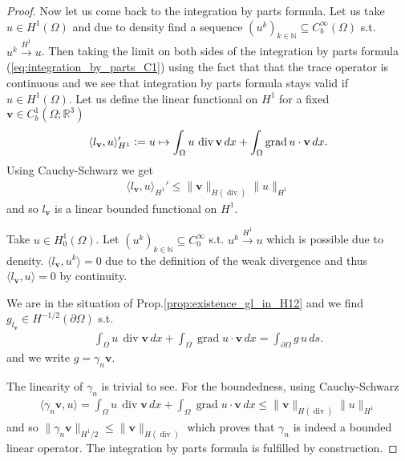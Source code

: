 \documentclass[12pt,a4paper]{article}
\numberwithin{equation}{subsection}
\numberwithin{lemma}{subsection}
\theoremstyle{definition}
\DeclareMathOperator{\diver}{div}
\DeclareMathOperator{\grad}{grad}
\newcommand{\naturalnum}{\mathbb{N}}
\newcommand{\real}{\mathbb{R}}
\begin{document}
\begin{proof}
    Now let us come back to the integration by parts formula. Let us take 
    $u \in H^1(\Omega)$ and due to density find a sequence $(u^k)_{k \in \naturalnum} \subseteq C_b^\infty(\Omega)$ 
    s.t. $u^k \xrightarrow{H^1} u$.
    Then taking the limit on both sides of the integration by parts formula 
    (\ref{eq:integration_by_parts_C1}) using the fact that 
    that the trace operator is continuous and we see that 
    integration by parts formula stays valid if $u \in H^1(\Omega)$. Let us define 
    the linear functional on $H^1$ for a fixed $\mathbf{v} \in C_b^1(\Omega;\real^3)$
    \begin{align*}
        \langle l_\mathbf{v}, u \rangle _{H^1}' \vcentcolon= u \mapsto \int_\Omega u \, \diver \mathbf{v} \, dx 
         + \int_\Omega \grad u \cdot \mathbf{v} \, dx.
    \end{align*}
    Using Cauchy-Schwarz we get
    \begin{align*}
        \langle l_\mathbf{v}, u \rangle _{H^1}' 
        \leq \lVert \mathbf{v} \rVert _{H(\diver)} \lVert u \rVert _{H^1} 
    \end{align*}
    and so $l_\mathbf{v}$ is a linear bounded functional on $H^1$.
    
    Take $u \in H^1_0(\Omega)$. 
    Let $(u^k)_{k\in \naturalnum} \subseteq C^\infty_0$ s.t. 
    $u^k \xrightarrow{H^1} u$ which is possible due to density. 
    $\langle l_\mathbf{v}, u^k \rangle  = 0$  due to the 
    definition of the weak divergence and thus $\langle l_\mathbf{v}, u \rangle = 0$
    by continuity.

    We are in the situation of Prop.\ref{prop:existence_gl_in_H12} 
    and we find $g_{l_\mathbf{v}} \in H^{-1/2}(\partial \Omega)$ 
    s.t. 
    \begin{align*}
        \int_\Omega u \, \diver \mathbf{v} \, dx 
        + \int_\Omega \grad u \cdot \mathbf{v} \, dx 
        = \int_{\partial \Omega} g \, u \, ds.
    \end{align*}
    and we write $g = \gamma_n \mathbf{v}$. 
    
    The linearity of $\gamma_n$ is trivial to see.
    For the boundedness, using Cauchy-Schwarz 
    \begin{align*}
        \langle \gamma_n \mathbf{v}, u \rangle 
        = \int_\Omega u \, \diver \mathbf{v} \, dx 
            + \int_\Omega \grad u \cdot \mathbf{v} \, dx
        \leq \lVert \mathbf{v} \rVert _{H(\diver)} \lVert u \rVert _{H^1}
    \end{align*}
    and so $\lVert \gamma_n \mathbf{v} \rVert _{H^1/2} \leq \lVert \mathbf{v} \rVert _{H(\diver)}$
    which proves that $\gamma_n$ is indeed a bounded linear operator. The integration
    by parts formula is fulfilled by construction. 


\end{proof}
\end{document}
